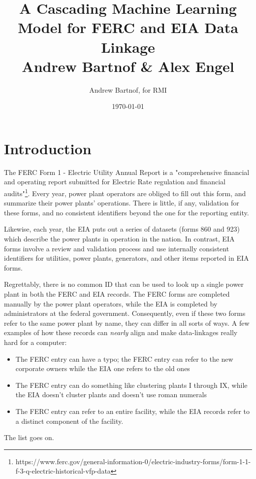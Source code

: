 \documentclass{article}
\begin{document}
\author{Andrew Bartnof, for RMI}
\title{A Cascading Machine Learning Model for FERC and EIA Data Linkage \\ Andrew Bartnof \& Alex Engel}
\date{\today}
\maketitle



\section{Introduction}

The FERC Form 1 - Electric Utility Annual Report is a "comprehensive financial and operating report submitted for Electric Rate regulation and financial audits"\footnote{https://www.ferc.gov/general-information-0/electric-industry-forms/form-1-1-f-3-q-electric-historical-vfp-data}. 
Every year, power plant operators are obliged to fill out this form, and summarize their power plants’ operations.
There is little, if any, validation for these forms, and no consistent identifiers beyond the one for the reporting entity.

Likewise, each year, the EIA puts out a series of datasets (forms 860 and 923) which describe the power plants in operation in the nation.
In contrast, EIA forms involve a review and validation process and use internally consistent identifiers for utilities, power plants, generators, and other items reported in EIA forms.

Regrettably, there is no common ID that can be used to look up a single power plant in both the FERC and EIA records. 
The FERC forms are completed manually by the power plant operators, while the EIA is completed by administrators at the federal government. 
Consequently, even if these two forms refer to the same power plant by name, they can differ in all sorts of ways. 
A few examples of how these records can \emph{nearly} align and make data-linkages really hard for a computer:
\begin{itemize} 
\item The FERC entry can have a typo; the FERC entry can refer to the new corporate owners while the EIA one refers to the old ones
\item The FERC entry can do something like clustering plants I through IX, while the EIA doesn’t cluster plants and doesn’t use roman numerals
\item  The FERC entry can refer to an entire facility, while the EIA records refer to a distinct component of the facility. 
\end{itemize}
\noindent The list goes on.
\end{document}
